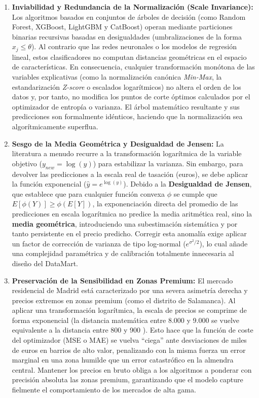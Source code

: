 \documentclass[a4paper,11pt,openany]{book}
\begin{document}
\begin{enumerate}
    \item \textbf{Inviabilidad y Redundancia de la Normalización (Scale Invariance):} Los algoritmos basados en conjuntos de árboles de decisión (como Random Forest, XGBoost, LightGBM y CatBoost) operan mediante particiones binarias recursivas basadas en desigualdades (umbralizaciones de la forma $x_j \le \theta$). Al contrario que las redes neuronales o los modelos de regresión lineal, estos clasificadores no computan distancias geométricas en el espacio de características. En consecuencia, cualquier transformación monótona de las variables explicativas (como la normalización canónica \textit{Min-Max}, la estandarización \textit{Z-score} o escalados logarítmicos) no altera el orden de los datos y, por tanto, no modifica los puntos de corte óptimos calculados por el optimizador de entropía o varianza. El árbol matemático resultante y sus predicciones son formalmente idénticos, haciendo que la normalización sea algorítmicamente superflua.
    
    \item \textbf{Sesgo de la Media Geométrica y Desigualdad de Jensen:} La literatura a menudo recurre a la transformación logarítmica de la variable objetivo ($y_{new} = \log(y)$) para estabilizar la varianza. Sin embargo, para devolver las predicciones a la escala real de tasación (euros), se debe aplicar la función exponencial ($\hat{y} = e^{\log(y)}$). Debido a la \textbf{Desigualdad de Jensen}, que establece que para cualquier función convexa $\phi$ se cumple que $E[\phi(Y)] \ge \phi(E[Y])$, la exponenciación directa del promedio de las predicciones en escala logarítmica no predice la media aritmética real, sino la \textbf{media geométrica}, introduciendo una subestimación sistemática y por tanto persistente en el precio predicho. Corregir esta anomalía exige aplicar un factor de corrección de varianza de tipo log-normal ($e^{\sigma^2/2}$), lo cual añade una complejidad paramétrica y de calibración totalmente innecesaria al diseño del DataMart.
    
    \item \textbf{Preservación de la Sensibilidad en Zonas Premium:} El mercado residencial de Madrid está caracterizado por una severa asimetría derecha y precios extremos en zonas premium (como el distrito de Salamanca). Al aplicar una transformación logarítmica, la escala de precios se comprime de forma exponencial (la distancia matemática entre 8.000 y 9.000  se vuelve equivalente a la distancia entre 800 y 900 ). Esto hace que la función de coste del optimizador (MSE o MAE) se vuelva ``ciega'' ante desviaciones de miles de euros en barrios de alto valor, penalizando con la misma fuerza un error marginal en una zona humilde que un error catastrófico en la almendra central. Mantener los precios en bruto obliga a los algoritmos a ponderar con precisión absoluta las zonas premium, garantizando que el modelo capture fielmente el comportamiento de los mercados de alta gama.
    

\end{enumerate}
\end{document}

